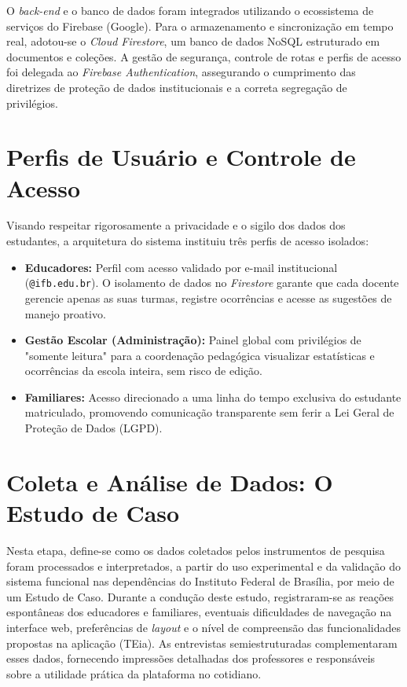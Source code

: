 O \textit{back-end} e o banco de dados foram integrados utilizando o ecossistema de serviços do Firebase (Google). Para o armazenamento e sincronização em tempo real, adotou-se o \textit{Cloud Firestore}, um banco de dados NoSQL estruturado em documentos e coleções. A gestão de segurança, controle de rotas e perfis de acesso foi delegada ao \textit{Firebase Authentication}, assegurando o cumprimento das diretrizes de proteção de dados institucionais e a correta segregação de privilégios.

\vspace{0.5cm}
\section{Perfis de Usuário e Controle de Acesso}

Visando respeitar rigorosamente a privacidade e o sigilo dos dados dos estudantes, a arquitetura do sistema instituiu três perfis de acesso isolados:

\begin{itemize}
    \item \textbf{Educadores:} Perfil com acesso validado por e-mail institucional (\texttt{@ifb.edu.br}). O isolamento de dados no \textit{Firestore} garante que cada docente gerencie apenas as suas turmas, registre ocorrências e acesse as sugestões de manejo proativo.
    \item \textbf{Gestão Escolar (Administração):} Painel global com privilégios de "somente leitura" para a coordenação pedagógica visualizar estatísticas e ocorrências da escola inteira, sem risco de edição.
    \item \textbf{Familiares:} Acesso direcionado a uma linha do tempo exclusiva do estudante matriculado, promovendo comunicação transparente sem ferir a Lei Geral de Proteção de Dados (LGPD).
\end{itemize}

\vspace{0.5cm}
\section{Coleta e Análise de Dados: O Estudo de Caso}

Nesta etapa, define-se como os dados coletados pelos instrumentos de pesquisa foram processados e interpretados, a partir do uso experimental e da validação do sistema funcional nas dependências do Instituto Federal de Brasília, por meio de um Estudo de Caso. Durante a condução deste estudo, registraram-se as reações espontâneas dos educadores e familiares, eventuais dificuldades de navegação na interface web, preferências de \textit{layout} e o nível de compreensão das funcionalidades propostas na aplicação (TEia). As entrevistas semiestruturadas complementaram esses dados, fornecendo impressões detalhadas dos professores e responsáveis sobre a utilidade prática da plataforma no cotidiano.

